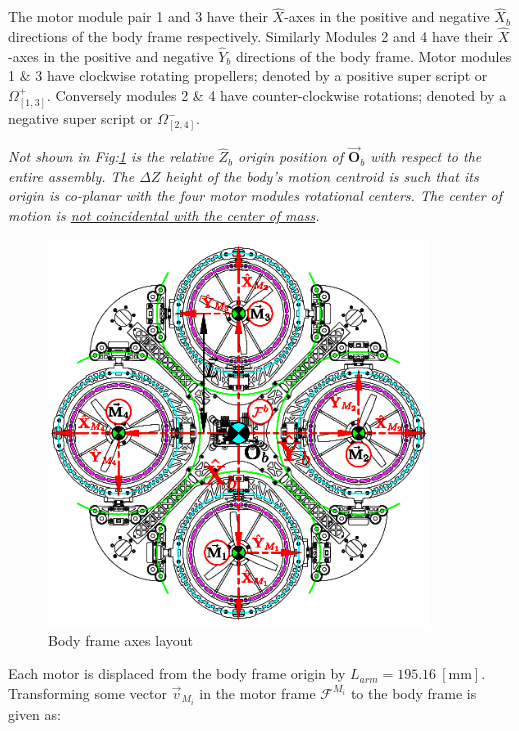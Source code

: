 \par
The motor module pair 1 and 3 have their $\hat{X}$-axes in the positive and negative $\hat{X}_b$ directions of the body frame respectively. Similarly Modules 2 and 4 have their $\hat{X}$-axes in the positive and negative $\hat{Y}_b$ directions of the body frame. Motor modules 1 \& 3 have clockwise rotating propellers; denoted by a positive super script or $\Omega_{[1,3]}^{+}$. Conversely modules 2 \& 4 have counter-clockwise rotations; denoted by a negative super script or $\Omega_{[2,4]}^{-}$.
\par
\emph{\color{Gray}Not shown in Fig:\ref{fig:body-frame} is the relative $\hat{Z}_b$ origin position of $\vec{\mathbf{O}}_b$ with respect to the entire assembly. The $\Delta Z$ height of the body's motion centroid is such that its origin is co-planar with the four motor modules rotational centers. The center of motion is \underline{not coincidental with the center of mass}.}
\begin{figure}[htbp]
\centering
\includegraphics[width=0.9\textwidth]{figs/body-frame}
\caption{Body frame axes layout}
\label{fig:body-frame}
\end{figure}
\par
Each motor is displaced from the body frame origin by $L_{arm}=195.16~[\text{mm}]$. Transforming some vector $\vec{v}_{M_i}$ in the motor frame $\mathcal{F}^{M_i}$ to the body frame is given as:
